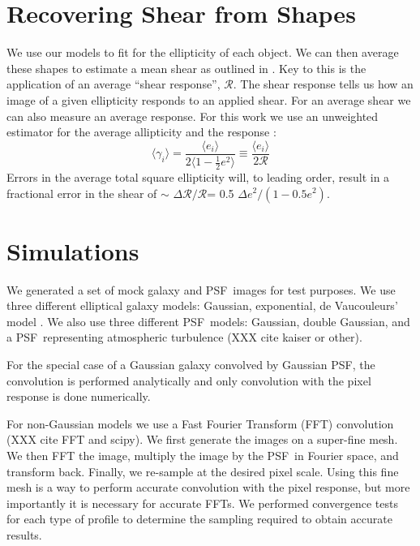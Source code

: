 \documentclass[10pt,preprint]{aastex}
\newcommand{\psf}{PSF}
\newcommand{\Rshear}{\ensuremath{\mathcal{R}}}
\newcommand{\rfracerr}{\ensuremath{\Delta \Rshear/\Rshear}}
\begin{document}
\section{Recovering Shear from Shapes}

We use our models to fit for the ellipticity of each object.  We can then
average these shapes to estimate a mean shear as outlined in \citet{bern02}.
Key to this is the application of an average ``shear response'', \Rshear.  The
shear response tells us how an image of a given ellipticity responds to an
applied shear.  For an average shear we can also measure an average response.
For this work we use an unweighted estimator for the average allipticity and
the response \citep[see e.g.  Equation 5.11,][]{bern02}:
\begin{equation} \label{eq:shearest}
\langle \gamma_i \rangle  = \frac{\langle e_i \rangle}{2 \langle 1 - \frac{1}{2} e^2 \rangle } \equiv
  \frac{\langle e_i \rangle}{2 \Rshear} 
\end{equation}
\noindent Errors in the average total square ellipticity will, to leading
order, result in a fractional error in the shear of $\sim$ \rfracerr = 
0.5 $\Delta e^2/(1-0.5 e^2)$.

\section{Simulations} \label{sec:sim}

We generated a set of mock galaxy and \psf\ images for test purposes.  We use
three different elliptical galaxy models: Gaussian, exponential, de
Vaucouleurs' model \citep{devauc1948}.  We also use three different \psf\ models:
Gaussian, double Gaussian, and a \psf\ representing atmospheric turbulence (XXX
cite kaiser or other).

For the special case of a Gaussian galaxy convolved by Gaussian \psf, the
convolution is performed analytically and only convolution with the pixel
response is done numerically.  

For non-Gaussian models we use a Fast Fourier Transform (FFT) convolution (XXX
cite FFT and scipy).  We first generate the images on a super-fine mesh. We
then FFT the image, multiply the image by the \psf\ in Fourier space, and
transform back. Finally, we re-sample at the desired pixel scale.  Using this
fine mesh is a way to perform accurate convolution with the pixel response, but
more importantly it is necessary for accurate FFTs.  We performed convergence
tests for each type of profile to determine the sampling required to obtain
accurate results.
\end{document}
